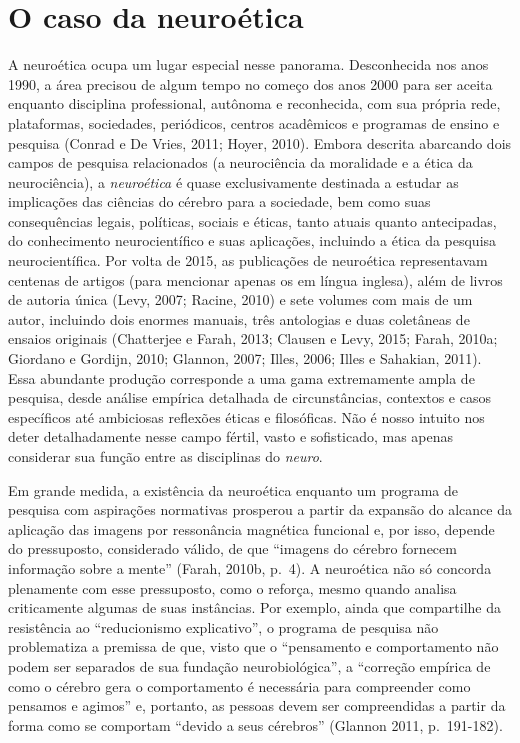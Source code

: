 \section{O caso da neuroética}

A neuroética ocupa um lugar especial nesse panorama. Desconhecida nos
anos 1990, a área precisou de algum tempo no começo dos anos 2000 para
ser aceita enquanto disciplina professional, autônoma e reconhecida,
com sua própria rede, plataformas, sociedades, periódicos, centros
acadêmicos e programas de ensino e pesquisa (Conrad e De Vries, 2011;
Hoyer, 2010). Embora descrita abarcando dois campos de pesquisa
relacionados (a neurociência da moralidade e a ética da neurociência), a
\emph{neuroética} é quase exclusivamente destinada a estudar as
implicações das ciências do cérebro para a sociedade, bem como suas
consequências legais, políticas, sociais e éticas, tanto atuais quanto
antecipadas, do conhecimento neurocientífico e suas aplicações,
incluindo a ética da pesquisa neurocientífica. Por volta de 2015, as
publicações de neuroética representavam centenas de artigos (para
mencionar apenas os em língua inglesa), além de livros de autoria
única (Levy, 2007; Racine, 2010) e sete volumes com mais de um autor,
incluindo dois enormes manuais, três antologias e duas coletâneas de
ensaios originais (Chatterjee e Farah, 2013; Clausen e Levy, 2015;
Farah, 2010a; Giordano e Gordijn, 2010; Glannon, 2007; Illes, 2006;
Illes e Sahakian, 2011). Essa abundante produção corresponde a uma
gama extremamente ampla de pesquisa, desde análise empírica
detalhada de circunstâncias, contextos e casos específicos até
ambiciosas reflexões éticas e filosóficas. Não é nosso intuito nos deter
detalhadamente nesse campo fértil, vasto e sofisticado, mas apenas
considerar sua função entre as disciplinas do \emph{neuro}.

Em grande medida, a existência da neuroética enquanto um programa de
pesquisa com aspirações normativas prosperou a partir da expansão do
alcance da aplicação das imagens por ressonância magnética funcional e,
por isso, depende do pressuposto, considerado válido, de que ``imagens
do cérebro fornecem informação sobre a mente'' (Farah, 2010b, p.~4). A
neuroética não só concorda plenamente com esse pressuposto, como o
reforça, mesmo quando analisa criticamente algumas de suas instâncias.
Por exemplo, ainda que compartilhe da resistência ao ``reducionismo
explicativo'', o programa de pesquisa não problematiza a premissa de
que, visto que o ``pensamento e comportamento não podem ser separados de
sua fundação neurobiológica'', a ``correção empírica de como o cérebro
gera o comportamento é necessária para compreender como pensamos e
agimos'' e, portanto, as pessoas devem ser compreendidas a partir da
forma como se comportam ``devido a seus cérebros'' (Glannon 2011,
p.~191-182).

